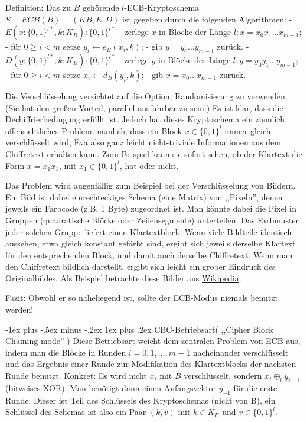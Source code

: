 \documentclass[a4paper]{article}
\makeatletter
\renewcommand{\subsubsection}{\@startsection{subsubsection}{3}{0mm}%
 {-1ex plus -.5ex minus -.2ex}%
 {1ex plus .2ex}%
 {\normalfont\small\bfseries}}
\makeatother
\begin{document}
\begin{multicols}{3}
    Definition: Das zu $B$ gehörende $l$-ECB-Kryptoschema $S=ECB(B)=(KB,E,D)$ ist gegeben durch die folgenden Algorithmen:
    - $E(x:\{0,1\}^{l*},k:K_B) :\{0,1\}^{l*}$
    - zerlege $x$ in Blöcke der Länge $l:x=x_0 x_1 ...x_{m-1}$;
    - für $0\geq i < m$ setze $y_i\leftarrow e_B(x_i,k)$;
    - gib $y=y_0 ...y_{m-1}$ zurück.
    - $D(y:\{0,1\}^{l*},k:K_B) :\{0,1\}^{l*}$
    - zerlege $y$ in Blöcke der Länge $l:y=y_0 y_1 ...y_{m-1}$;
    - für $0\geq i < m$ setze $x_i\leftarrow d_B(y_i,k)$;
    - gib $x=x_0 ...x_{m-1}$ zurück.

    Die Verschlüsselung verzichtet auf die Option, Randomisierung zu verwenden. (Sie hat den großen Vorteil, parallel ausführbar zu sein.) Es ist klar, dass die Dechiffrierbedingung erfüllt ist. Jedoch hat dieses Kryptoschema ein ziemlich offensichtliches Problem, nämlich,
    dass ein Block $x\in\{0,1\}^l$ immer gleich verschlüsselt wird, Eva also ganz leicht nicht-triviale Informationen aus dem Chiffretext erhalten kann. Zum Beispiel kann sie sofort sehen, ob der Klartext die Form $x=x_1 x_1$, mit $x_1\in\{0,1\}^l$, hat oder nicht.

    Das Problem wird augenfällig zum Beispiel bei der Verschlüsselung von Bildern. Ein Bild ist dabei einrechteckiges Schema (eine Matrix) von ,,Pixeln'', denen jeweils ein Farbcode (z.B. 1 Byte) zugeordnet ist. Man könnte dabei die Pixel in Gruppen (quadratische Blöcke oder Zeilensegmente) unterteilen. Das Farbmuster jeder solchen Gruppe liefert einen Klartextblock. Wenn viele Bildteile identisch aussehen, etwa gleich konstant gefärbt sind, ergibt sich jeweils derselbe Klartext für den entsprechenden Block, und damit auch derselbe Chiffretext. Wenn man den Chiffretext bildlich darstellt, ergibt sich leicht ein grober Eindruck des Originalbildes. Als Beispiel betrachte diese Bilder aus \href{https://de.wikipedia.org/wiki/Electronic_Code_Book_Mode}{Wikipedia}.

    Fazit: Obwohl er so naheliegend ist, sollte der ECB-Modus niemals benutzt werden!

    \subsubsection{CBC-Betriebsart( ,,Cipher Block Chaining mode'' )}
    Diese Betriebsart weicht dem zentralen Problem von ECB aus, indem man die Blöcke in Runden $i=0, 1 ,...,m-1$ nacheinander verschlüsselt und das Ergebnis einer Runde zur Modifikation des Klartextblocks der nächsten Runde benutzt. Konkret: Es wird nicht $x_i$ mit $B$ verschlüsselt, sondern $x_i\oplus_l y_{i-1}$ (bitweises XOR). Man benötigt dann einen Anfangsvektor $y_{-1}$ für die erste Runde. Dieser ist Teil des Schlüssels des Kryptoschemas (nicht von B), ein Schlüssel des Schemas ist also ein Paar $(k,v)$ mit $k\in K_B$ und $v\in\{0,1\}^l$.


\end{multicols}
\end{document}
